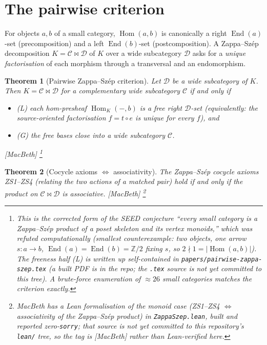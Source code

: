 \documentclass[11pt,a4paper]{book}
\DeclareMathOperator{\Hom}{Hom}
\DeclareMathOperator{\End}{End}
\theoremstyle{plain}
\newtheorem{Theorem}{Theorem}[chapter]
\theoremstyle{definition}
\theoremstyle{remark}
\newcommand{\prov}[1]{\hfill\textsf{\footnotesize[#1]}}
\begin{document}
\section{The pairwise criterion}

For objects $a,b$ of a small category, $\Hom(a,b)$ is canonically a right
$\End(a)$-set (precomposition) and a left $\End(b)$-set (postcomposition). A
Zappa--Sz\'ep decomposition $K=\mathcal C\bowtie\mathcal D$ of $K$ over a wide
subcategory $\mathcal D$ asks for a \emph{unique factorisation} of each morphism
through a transversal and an endomorphism.

\begin{Theorem}[Pairwise Zappa--Sz\'ep criterion]\label{thm:zscriterion}
Let $\mathcal D$ be a wide subcategory of $K$. Then $K=\mathcal C\bowtie\mathcal D$
for a complementary wide subcategory $\mathcal C$ if and only if
\begin{itemize}[nosep]
  \item \textup{(L)} each hom-presheaf $\Hom_K(-,b)$ is a \emph{free} right
        $\mathcal D$-set (equivalently: the source-oriented factorisation
        $f=t\circ e$ is unique for every $f$), and
  \item \textup{(G)} the free bases close into a wide subcategory $\mathcal C$.
\end{itemize}
\prov{MacBeth}%
\footnote{This is the corrected form of the SEED conjecture ``every small category
is a Zappa--Sz\'ep product of a poset skeleton and its vertex monoids,'' which was
\emph{refuted} computationally (smallest counterexample: two objects, one arrow
$s\colon a\to b$, $\End(a)=\End(b)=\mathbb Z/2$ fixing $s$, so
$2\nmid 1=|\Hom(a,b)|$). The freeness half (L) is written up self-contained in
\texttt{papers/pairwise-zappa-szep.tex} (a built PDF is in the repo; the
\texttt{.tex} source is not yet committed to this tree). A brute-force enumeration
of $\approx 26$ small categories matches the criterion exactly.}
\end{Theorem}

\begin{Theorem}[Cocycle axioms $\Longleftrightarrow$ associativity]\label{thm:zsassoc}
The Zappa--Sz\'ep cocycle axioms ZS1--ZS4 (relating the two actions of a matched
pair) hold if and only if the product on $\mathcal C\bowtie\mathcal D$ is
associative.
\prov{MacBeth}%
\footnote{MacBeth has a Lean formalisation of the monoid case (ZS1--ZS4
$\Longleftrightarrow$ associativity of the Zappa--Sz\'ep product) in
\texttt{ZappaSzep.lean}, built and reported zero-\texttt{sorry}; that source is
\emph{not yet committed} to this repository's \texttt{lean/} tree, so the tag is
\textsf{[MacBeth]} rather than \textsf{Lean-verified} here.}
\end{Theorem}
\end{document}
